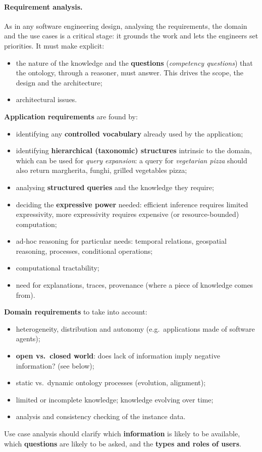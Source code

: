 \paragraph{Requirement analysis.}
As in any software engineering design, analysing the requirements, the domain and the
use cases is a critical stage: it grounds the work and lets the engineers set
priorities. It must make explicit:
\begin{itemize}[nosep]
  \item the nature of the knowledge and the \textbf{questions} (\emph{competency
        questions}) that the ontology, through a reasoner, must answer. This drives the
        scope, the design and the architecture;
  \item architectural issues.
\end{itemize}

\textbf{Application requirements} are found by:
\begin{itemize}[nosep]
  \item identifying any \textbf{controlled vocabulary} already used by the application;
  \item identifying \textbf{hierarchical (taxonomic) structures} intrinsic to the
        domain, which can be used for \emph{query expansion}: a query for
        \emph{vegetarian pizza} should also return margherita, funghi, grilled vegetables
        pizza;
  \item analysing \textbf{structured queries} and the knowledge they require;
  \item deciding the \textbf{expressive power} needed: efficient inference requires
        limited expressivity, more expressivity requires expensive (or resource-bounded)
        computation;
  \item ad-hoc reasoning for particular needs: temporal relations, geospatial reasoning,
        processes, conditional operations;
  \item computational tractability;
  \item need for explanations, traces, provenance (where a piece of knowledge comes
        from).
\end{itemize}

\textbf{Domain requirements} to take into account:
\begin{itemize}[nosep]
  \item heterogeneity, distribution and autonomy (e.g.\ applications made of software
        agents);
  \item \textbf{open vs.\ closed world}: does lack of information imply negative
        information? (see below);
  \item static vs.\ dynamic ontology processes (evolution, alignment);
  \item limited or incomplete knowledge; knowledge evolving over time;
  \item analysis and consistency checking of the instance data.
\end{itemize}
Use case analysis should clarify which \textbf{information} is likely to be available,
which \textbf{questions} are likely to be asked, and the \textbf{types and roles of
users}.

